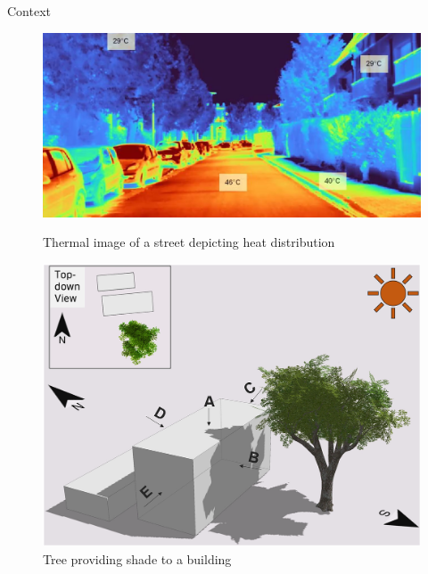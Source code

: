 \documentclass[10pt]{beamer}
\begin{document}
\begin{frame}{Context}
\begin{figure}[h]
    \centering
    \begin{minipage}{0.49\textwidth}
        \centering
        \includegraphics[width=\textwidth]{images/heat-street.png}
        \caption{Thermal image of a street depicting heat distribution \cite{img:street_thermography}}
        \label{fig:figure1}
    \end{minipage}\hfill
    \begin{minipage}{0.49\textwidth}
        \centering
        \includegraphics[width=\textwidth]{images/tree-shade.png}
        \caption{Tree providing shade to a building \cite{img:TreeShade}}
        \label{fig:figure2}
    \end{minipage}
\end{figure}
\end{frame}
\end{document}
